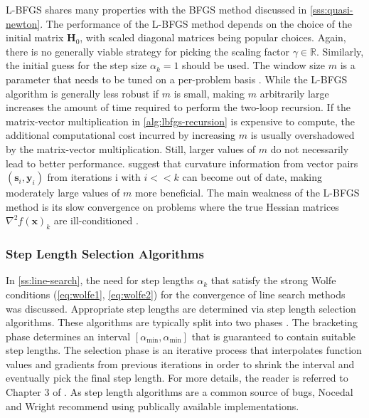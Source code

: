 L-BFGS shares many properties with the BFGS method discussed in \cref{sss:quasi-newton}. The performance of the L-BFGS method depends 
on the choice of the initial matrix $\bm{H}_0$, with scaled diagonal matrices being popular choices. Again, there is no generally viable
strategy for picking the scaling factor $\gamma \in \mathbb{R}$. Similarly, the initial guess for the step size $\alpha_k=1$ should be used.
The window size $m$ is a parameter that needs to be tuned on a per-problem basis \cite{nocedal2006}. While the L-BFGS algorithm is 
generally less robust if
$m$ is small, making $m$ arbitrarily large increases the amount of time required to perform the two-loop recursion. If the matrix-vector
multiplication in \cref{alg:lbfgs-recursion} is expensive to compute, the additional computational cost incurred by increasing $m$ is 
usually overshadowed by the matrix-vector multiplication. Still, larger values of $m$ do not necessarily lead to better performance. 
\cite{liu2017} suggest that curvature information from vector pairs $(\bm{s}_i, \bm{y}_i)$ from iterations i with $i << k$ can become 
out of date, making moderately large values of $m$ more beneficial. The main weakness of the L-BFGS method is its slow convergence on 
problems where the true Hessian matrices $\nabla^2 f(\bm{x})_k$ are ill-conditioned \cite{nocedal2006}.

\subsubsection{Step Length Selection Algorithms}\label{sss:step-length-selection}
In \cref{ss:line-search}, the need for step lengths $\alpha_k$ that satisfy the strong Wolfe conditions (\cref{eq:wolfe1}, \cref{eq:wolfe2})
for the convergence of line search methods was discussed. Appropriate step lengths are determined via step length selection algorithms. 
These algorithms are typically
split into two phases \cite{nocedal2006}. The bracketing phase determines an interval $[\alpha_{\text{min}}, \alpha_{\text{min}}]$ that is 
guaranteed to contain suitable step lengths. The selection phase is an iterative process that interpolates function values and gradients 
from previous iterations in order to shrink the interval and eventually pick the final step length. For more details, the reader is 
referred to Chapter 3 of \cite{nocedal2006}. As step length algorithms are a common source of bugs, Nocedal and Wright \cite{nocedal2006}
recommend using publically available implementations.

